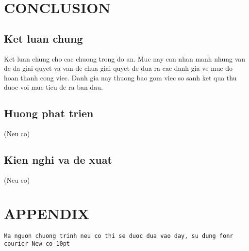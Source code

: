 \documentclass{article}
\begin{document}
\section*{CONCLUSION}
 {}
\subsection*{Ket luan chung}
 {}
Ket luan chung cho cac chuong trong do an. Muc nay can nhan manh nhung van de da giai quyet va van de chua giai quyet de dua ra cac danh gia ve muc do hoan thanh cong viec. Danh gia nay thuong bao gom viec so sanh ket qua thu duoc voi muc tieu de ra ban dau.
\subsection*{Huong phat trien}
 {}
(Neu co)
\subsection*{Kien nghi va de xuat}
 {}
(Neu co)
\cleardoublepage

 {}


\cleardoublepage

\section*{APPENDIX}
 {}
\texttt{\fontsize{10pt}{0pt}\selectfont Ma nguon chuong trinh neu co thi se duoc dua vao day, su dung fonr courier New co 10pt}
\end{document}
